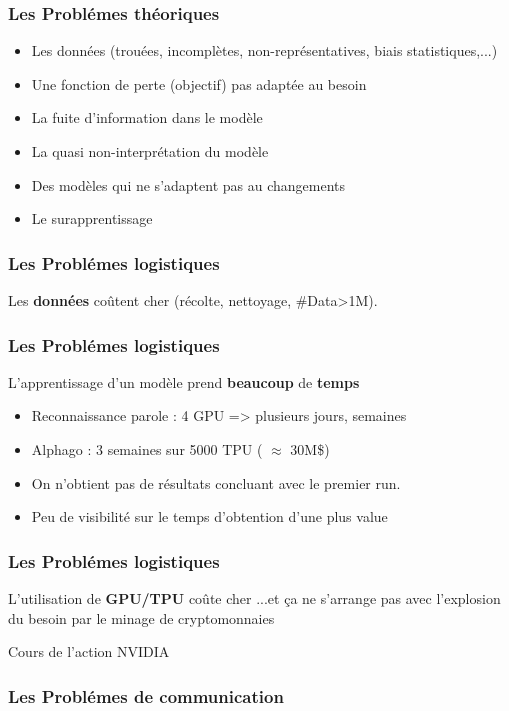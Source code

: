 \begin{frame}
  \frametitle{Les Problémes théoriques}
  \begin{itemize}
  \item Les données (trouées, incomplètes, non-représentatives, biais statistiques,...)
  \item Une fonction de perte (objectif) pas adaptée au besoin
  \item La fuite d'information dans le modèle
  \item La quasi non-interprétation du modèle
  \item Des modèles qui ne s'adaptent pas au changements
  \item Le surapprentissage
  \end{itemize}
\end{frame}

\begin{frame}
  \frametitle{Les Problémes logistiques}
  Les \textbf{données} coûtent cher (récolte, nettoyage, \#Data>1M). 
\end{frame}

\begin{frame}
  \frametitle{Les Problémes logistiques}
  L'apprentissage d'un modèle prend \textbf{beaucoup} de \textbf{temps}
  \begin{itemize}
  \item Reconnaissance parole : 4 GPU => plusieurs jours, semaines
  \item Alphago : 3 semaines sur 5000 TPU ( $\approx$ 30M\$)
  \item On n'obtient pas de résultats concluant avec le premier run.
  \item Peu de visibilité sur le temps d'obtention d'une plus value
  \end{itemize}
\end{frame}

\begin{frame}
  \frametitle{Les Problémes logistiques}
  L'utilisation de \textbf{GPU/TPU} coûte cher
  \newline
  ...et ça ne s'arrange pas avec l'explosion du besoin par le minage de cryptomonnaies
  \begin{center}
    \small Cours de l'action NVIDIA
  \end{center}
\end{frame}

\begin{frame}
\frametitle{Les Problémes de communication}
\end{frame}

